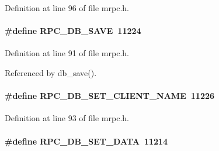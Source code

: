 \begin{DoxyItemize}
\item 
\end{DoxyItemize}

Definition at line 96 of file mrpc.h.
\paragraph[{RPC\_\-DB\_\-SAVE}]{\setlength{\rightskip}{0pt plus 5cm}\#define RPC\_\-DB\_\-SAVE~11224}\hfill\label{group__mrpcdefineh_gadb19d2a6b51b4fe39ffe61e6299ad8d2}

\begin{DoxyItemize}
\item 
\end{DoxyItemize}

Definition at line 91 of file mrpc.h.

Referenced by db\_\-save().
\paragraph[{RPC\_\-DB\_\-SET\_\-CLIENT\_\-NAME}]{\setlength{\rightskip}{0pt plus 5cm}\#define RPC\_\-DB\_\-SET\_\-CLIENT\_\-NAME~11226}\hfill\label{group__mrpcdefineh_ga5e2400a5528a9d3640e28e80291ffcfe}

\begin{DoxyItemize}
\item 
\end{DoxyItemize}

Definition at line 93 of file mrpc.h.
\paragraph[{RPC\_\-DB\_\-SET\_\-DATA}]{\setlength{\rightskip}{0pt plus 5cm}\#define RPC\_\-DB\_\-SET\_\-DATA~11214}\hfill\label{group__mrpcdefineh_ga8a9ca4be59df7624dd39380b21cbbb88}

\begin{DoxyItemize}
\item 
\end{DoxyItemize}

